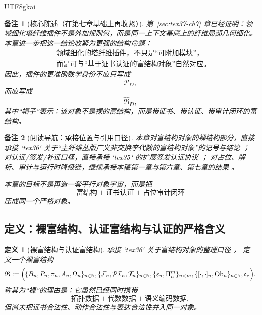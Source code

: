 \documentclass[12pt]{article}
\newtheorem{definition}{定义}[section]
\newtheorem{remark}{备注}[section]
\newcommand{\NN}{\mathbb{N}}
\newcommand{\Ob}{\operatorname{Ob}}
\begin{document}
\begin{CJK*}{UTF8}{gkai}
\begin{remark}[核心陈述（在第七章基础上再收紧）]
第~\ref{sec:tex37-ch7} 章已经证明：领域细化塔纤维插件不是外加规则包，而是同一上下文基底上的纤维局部几何细化。
本章进一步把这一结论收紧为更强的结构命题：
\[
  \boxed{
    \begin{aligned}
      &\text{领域细化的塔纤维插件，不只是“可附加模块”，}\\
      &\text{而是可与“基于证书认证的富结构对象”自然对应。}
    \end{aligned}
  }
\]
因此，插件的更准确数学身份不应只写成
\[
  \mathcal P_D,
\]
而应写成
\[
  \widehat{\mathfrak R}_D,
\]
其中“帽子”表示：该对象不是裸的富结构，而是带证书、带认证、带审计闭环的富结构。
\end{remark}

\begin{remark}[阅读导航：承接位置与引用口径]
本章对富结构对象的裸结构部分，直接承接 `tex36` 关于“主纤维丛版广义非交换李代数的富结构对象”的记号与结论 \cite{RepoTex36HomotopyTwistBijection}；
对认证/签发/补证口径，直接承接 `tex35` 的扩展签发认证协议 \cite{RepoTex35ExtendedCertificationTower}；
对占位、解析、审计与运行时降级链，继续承接本稿第一章与第六章、第七章的结果 \cite{RepoTex20SemanticGaugeNormalization,RepoTex21AuditedWrapper,
  RepoTex23SemanticBase,GaoZhengAppVol2,GaoZhengAppVol3,GaoZheng2025GFramework}。

本章的目标不是再造一套平行对象宇宙，而是把
\[
  \text{富结构}
  +
  \text{证书认证}
  +
  \text{占位审计闭环}
\]
压成同一个严格对象。
\end{remark}

\subsection{定义：裸富结构、认证富结构与认证的严格含义}
\label{subsec:tex37-ch8-definitions}

\begin{definition}[裸富结构与认证富结构]
\label{def:tex37-ch8-bare-rich}
承接 `tex36` 关于富结构对象的整理口径 \cite{RepoTex36HomotopyTwistBijection}，
定义一个裸富结构
\[
  \mathfrak R
  :=
  \Bigl(
    \{B_n,P_n,\pi_n,A_n,\Omega_n\}_{n\in\NN},
    \{\mathcal F_n,\mathcal{PI}_n,\mathcal T_n\}_{n\in\NN},
    \{\varepsilon_n,\Pi_n^m\}_{n<m},
    \{[\cdot,\cdot]_n,\Ob_n\}_{n\in\NN},
    \mathfrak c_{\tau}
  \Bigr).
\]
称其为“裸”的理由是：它虽然已经同时携带
\[
  \text{拓扑数据}
  +
  \text{代数数据}
  +
  \text{语义编码数据},
\]
但尚未把证书合法性、动作合法性与表达合法性并入同一对象。


\end{definition}
\end{CJK*}
\end{document}
